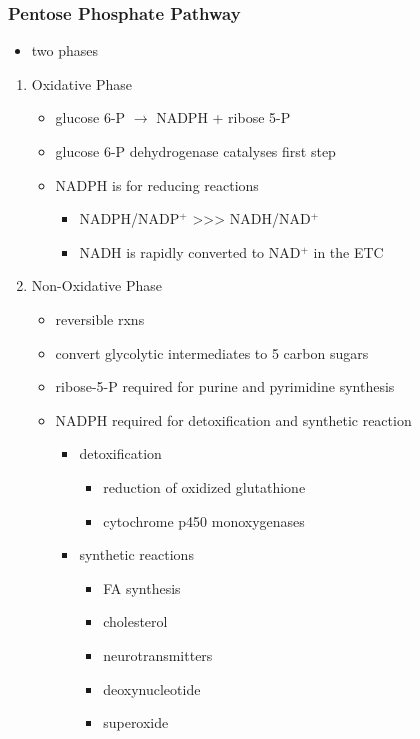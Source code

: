 \documentclass{scrartcl}
\begin{document}
\subsubsection{Pentose Phosphate Pathway}
\label{sec:orgc8ba8b7}
\begin{itemize}
\item two phases
\end{itemize}
\begin{enumerate}
\item Oxidative Phase
\label{sec:org9a4a8ff}
\begin{itemize}
\item glucose 6-P \(\to\) NADPH + ribose 5-P
\item glucose 6-P dehydrogenase catalyses first step
\item NADPH is for reducing reactions
\begin{itemize}
\item NADPH/NADP\(^{\text{+}}\) \textgreater{}\textgreater{}\textgreater{} NADH/NAD\(^{\text{+}}\)
\item NADH is rapidly converted to NAD\(^{\text{+}}\) in the ETC
\end{itemize}
\end{itemize}
\item Non-Oxidative Phase
\label{sec:orgafe460f}
\begin{itemize}
\item reversible rxns
\item convert glycolytic intermediates to 5 carbon sugars

\item ribose-5-P required for purine and pyrimidine synthesis
\item NADPH required for detoxification and synthetic reaction
\begin{itemize}
\item detoxification
\begin{itemize}
\item reduction of oxidized glutathione
\item cytochrome p450 monoxygenases
\end{itemize}
\item synthetic reactions
\begin{itemize}
\item FA synthesis
\item cholesterol
\item neurotransmitters
\item deoxynucleotide
\item superoxide
\end{itemize}
\end{itemize}
\end{itemize}
\end{enumerate}
\end{document}
